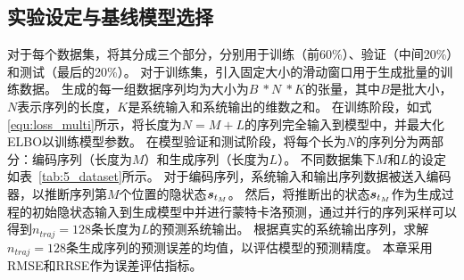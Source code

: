 \subsection{实验设定与基线模型选择}
对于每个数据集，将其分成三个部分，分别用于训练（前60\%）、验证（中间20\%）和测试（最后的20\%）。
对于训练集，引入固定大小的滑动窗口用于生成批量的训练数据。
生成的每一组数据序列均为大小为$B \ * N\ * K$的张量，其中$B$是批大小，$N$表示序列的长度，$K$是系统输入和系统输出的维数之和。
在训练阶段，如式\eqref{equ:loss_multi}所示，将长度为$N=M+L$的序列完全输入到模型中，并最大化ELBO以训练模型参数。
在模型验证和测试阶段，将每个长为$N$的序列分为两部分：编码序列（长度为$M$）和生成序列（长度为$L$）。
不同数据集下$M$和$L$的设定如表~\ref{tab:5_dataset}所示。
对于编码序列，系统输入和输出序列数据被送入编码器，以推断序列第$M$个位置的隐状态$\boldsymbol s_{t_M}$。
然后，将推断出的状态$\boldsymbol s_{t_M}$作为生成过程的初始隐状态输入到生成模型中并进行蒙特卡洛预测，通过并行的序列采样可以得到$n_{traj}=128$条长度为$L$的预测系统输出。
根据真实的系统输出序列，求解$n_{traj}=128$条生成序列的预测误差的均值，以评估模型的预测精度。
本章采用RMSE和RRSE作为误差评估指标。

